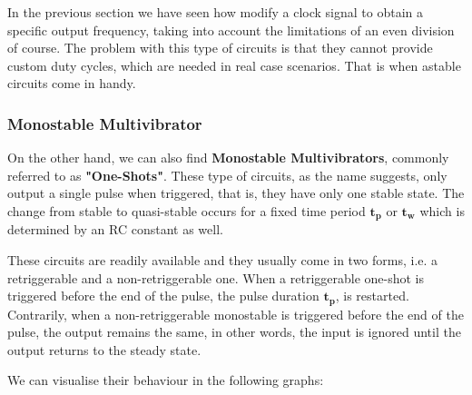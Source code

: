 \documentclass[a4paper, 11pt, oneside]{article}
\begin{document}
In the previous section we have seen how modify a clock signal to obtain a specific output frequency, taking into account the limitations of an even division of course. The problem with this type of circuits is that they cannot provide custom duty cycles, which are needed in real case scenarios. That is when astable circuits come in handy.\medskip

\subsubsection{Monostable Multivibrator}

On the other hand, we can also find \textbf{Monostable Multivibrators}, commonly referred to as \textbf{"One-Shots"}. These type of circuits, as the name suggests, only output a single pulse when triggered, that is, they have only one stable state. The change from stable to quasi-stable occurs for a fixed time period $\mathbf{t_{p}}$ or $\mathbf{t_{w}}$ which is determined by an RC constant as well.\medskip

These circuits are readily available and they usually come in two forms, i.e. a retriggerable and a non-retriggerable one. When a retriggerable one-shot is triggered before the end of the pulse, the pulse duration $\mathbf{t_{p}}$, is restarted. Contrarily, when a non-retriggerable monostable is triggered before the end of the pulse, the output remains the same, in other words, the input is ignored until the output returns to the steady state.\medskip


\clearpage

We can visualise their behaviour in the following graphs:
\end{document}
